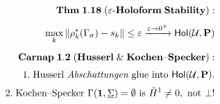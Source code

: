 \documentclass[preview]{standalone}
\begin{document}
\begin{align*}
\special{dvisvgm:raw <g id='unique000'>}\mathbf{Thm\;1.18\;(\varepsilon\text{-}Holoform\;Stability):}\\[3pt]\max_{k} \|\rho_k^*(\Gamma_\sigma) - s_k\| \le \varepsilon \xrightarrow{\varepsilon\to 0^+} \mathsf{Hol}(\mathcal{U},\mathbf{P})\\[5pt]\mathbf{Carnap\;1.2\;(Husserl\;\&\;Kochen\text{--}Specker):}\\[3pt]1.\;\text{Husserl }\textit{Abschattungen}\text{ glue into }\mathsf{Hol}(\mathcal{U},\mathbf{P}).\\[2pt]2.\;\text{Kochen--Specker }\Gamma(\mathbf{1},\underline{\Sigma})=\emptyset\text{ is }\check{H}^1\neq 0,\text{ not }\bot!\special{dvisvgm:raw </g>}
\end{align*}
\end{document}
